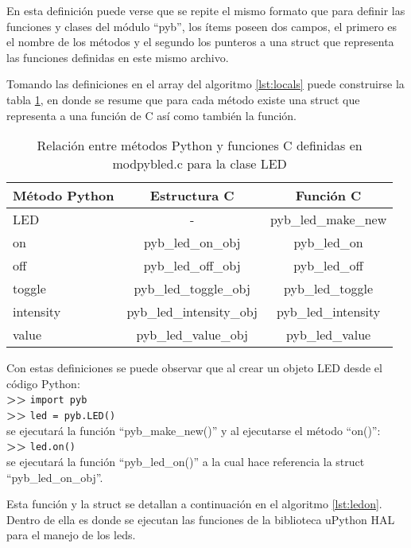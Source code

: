 En esta definición puede verse que se repite el mismo formato que para definir las funciones y clases del módulo “pyb”, los ítems poseen dos campos, el primero es el nombre de los métodos y el segundo los punteros a una struct que representa las funciones definidas en este mismo archivo.

Tomando las definiciones en el array del algoritmo \ref{lst:locals} puede construirse la tabla \ref{tab:methfn}, en donde se resume que para cada método existe una struct que representa a una función de C así como también la función.

\begin{table}[h]
	\centering
	\caption[Relación entre métodos Python y funciones C]{Relación entre métodos Python y funciones C definidas en modpybled.c para la clase LED}
	\begin{tabular}{l c c}    
		\toprule
		\textbf{Método Python} 	 & \textbf{Estructura C} & \textbf{Función C}  \\
		\midrule
		LED	 				& - 												& pyb\_led\_make\_new \\	
		on	 				& pyb\_led\_on\_obj 				& pyb\_led\_on 					\\		
		off 	 			& pyb\_led\_off\_obj 				& pyb\_led\_off					\\
		toggle	 		& pyb\_led\_toggle\_obj 		& pyb\_led\_toggle			\\
		intensity	 	& pyb\_led\_intensity\_obj 	& pyb\_led\_intensity		\\
		value	 			& pyb\_led\_value\_obj 			&	pyb\_led\_value 			\\
		\bottomrule
		\hline
	\end{tabular}
	\label{tab:methfn}
\end{table}

Con estas definiciones se puede observar que al crear un objeto LED desde el código Python:\\
\textbf{{\fontsize{16}{16}\selectfont \textgreater\textgreater}} \texttt{import pyb}\\
\textbf{{\fontsize{16}{16}\selectfont \textgreater\textgreater}} \texttt{led = pyb.LED()}\\
se ejecutará la función “pyb\_make\_new()” y al ejecutarse el método “on()”:\\
\textbf{{\fontsize{16}{16}\selectfont \textgreater\textgreater}} \texttt{led.on()}\\
se ejecutará la función “pyb\_led\_on()” a la cual hace referencia la struct “pyb\_led\_on\_obj”.

Esta función y la struct se detallan a continuación en el algoritmo \ref{lst:ledon}. Dentro de ella es donde se ejecutan las funciones de la biblioteca uPython HAL para el manejo de los leds.

